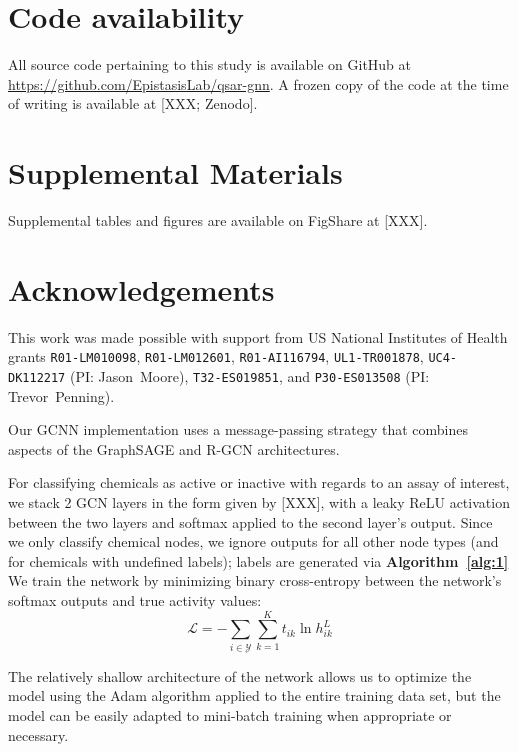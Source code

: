\documentclass{ws-procs11x85}
\begin{document}
\section{Code availability}
All source code pertaining to this study is available on GitHub at \url{https://github.com/EpistasisLab/qsar-gnn}.
A frozen copy of the code at the time of writing is available at [XXX; Zenodo].

\section{Supplemental Materials}
Supplemental tables and figures are available on FigShare at [XXX].

\section*{Acknowledgements}
This work was made possible with support from US National Institutes of Health grants \texttt{R01-LM010098}, \texttt{R01-LM012601}, \texttt{R01-AI116794}, \texttt{UL1-TR001878}, \texttt{UC4-DK112217} (PI: Jason~Moore), \texttt{T32-ES019851}, and \texttt{P30-ES013508} (PI: Trevor~Penning).

\label{GCNN}
Our GCNN implementation uses a message-passing strategy that combines aspects of the GraphSAGE and R-GCN architectures.


\label{NC}
For classifying chemicals as active or inactive with regards to an assay of interest, we stack 2 GCN layers in the form given by [XXX], with a leaky ReLU activation between the two layers and softmax applied to the second layer's output.
Since we only classify chemical nodes, we ignore outputs for all other node types (and for chemicals with undefined labels); labels are generated via \textbf{Algorithm~\ref{alg:1}}
We train the network by minimizing binary cross-entropy between the network's softmax outputs and true activity values:
\begin{equation}
   \mathcal{L} = -\sum_{i\in\mathcal{Y}}\sum_{k=1}^K t_{ik} \ln h_{ik}^L
\end{equation}

The relatively shallow architecture of the network allows us to optimize the model using the Adam algorithm applied to the entire training data set, but the model can be easily adapted to mini-batch training when appropriate or necessary.



\end{document}

